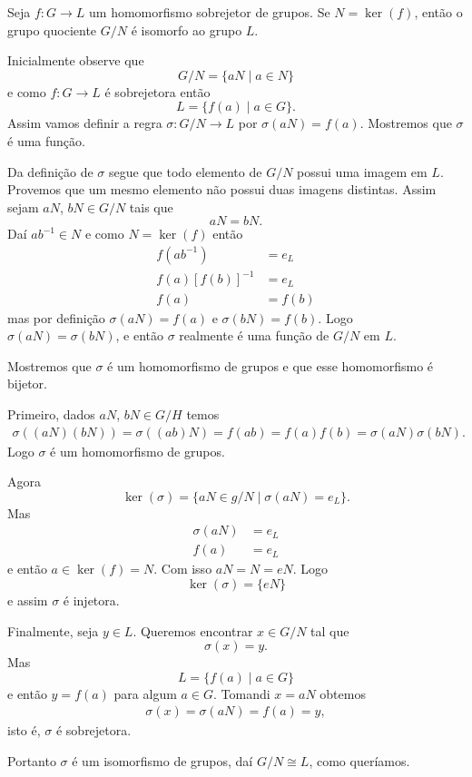 \begin{teorema}\label{primeiro_teorema_homomorfismo}
    Seja $f : G \to L$ um homomorfismo sobrejetor de grupos. Se $N = \ker(f)$, então o grupo quociente $G/N$ é isomorfo ao grupo $L$.
\end{teorema}
\begin{prova}
    Inicialmente observe que
    \[
        G/N = \{aN \mid a \in N\}
    \]
    e como $f : G \to L$ é sobrejetora então
    \[
        L = \{f(a) \mid a \in G\}.
    \]
    Assim vamos definir a regra $\sigma : G/N \to L$ por $\sigma(aN) = f(a)$. Mostremos que $\sigma$ é uma função.

    Da definição de $\sigma$ segue que todo elemento de $G/N$ possui uma imagem em $L$. Provemos que um mesmo elemento não possui duas imagens distintas. Assim sejam $aN$, $bN \in G/N$ tais que
    \[
        aN = bN.
    \]
    Daí $ab^{-1} \in N$ e como $N = \ker(f)$ então
    \begin{align*}
        f(ab^{-1}) &= e_L\\
        f(a)[f(b)]^{-1} &= e_L\\
        f(a) &= f(b)
    \end{align*}
    mas por definição $\sigma(aN) = f(a)$ e $\sigma(bN) = f(b)$. Logo $\sigma(aN) = \sigma(bN)$, e então $\sigma$ realmente é uma função de $G/N$ em $L$.

    Mostremos que $\sigma$ é um homomorfismo de grupos e que esse homomorfismo é bijetor.

    Primeiro, dados $aN$, $bN \in G/H$ temos
    \begin{align*}
        \sigma((aN)(bN)) = \sigma((ab)N) = f(ab) = f(a)f(b) = \sigma(aN)\sigma(bN).
    \end{align*}
    Logo $\sigma$ é um homomorfismo de grupos.

    Agora
    \[
        \ker(\sigma) = \{aN \in g/N \mid \sigma(aN) = e_L\}.
    \]
    Mas
    \begin{align*}
        \sigma(aN) &= e_L\\
        f(a) &= e_L
    \end{align*}
    e então $a \in \ker(f) = N$. Com isso $aN = N = eN$. Logo
    \[
        \ker(\sigma) = \{eN\}
    \]
    e assim $\sigma$ é injetora.

    Finalmente, seja $y \in L$. Queremos encontrar $x \in G/N$ tal que
    \[
        \sigma(x) = y.
    \]
    Mas
    \[
        L = \{f(a) \mid a \in G\}
    \]
    e então $y = f(a)$ para algum $a \in G$. Tomandi $x = aN$ obtemos
    \begin{align*}
        \sigma(x) = \sigma(aN) = f(a) = y,
    \end{align*}
    isto é, $\sigma$ é sobrejetora.

    Portanto $\sigma$ é um isomorfismo de grupos, daí $G/N \cong L$, como queríamos.
\end{prova}

